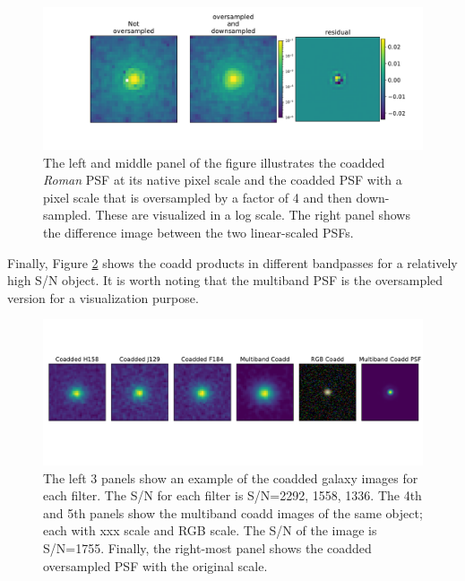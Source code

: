\documentclass[fleqn,usenatbib]{mnras}
\begin{document}
\begin{figure}
	\includegraphics[width=\columnwidth]{figure3.pdf}
    \vspace*{-5mm}
    \caption{The left and middle panel of the figure illustrates the coadded \emph{Roman} PSF at its native pixel scale and the coadded PSF with a pixel scale that is oversampled by a factor of 4 and then down-sampled. These are visualized in a log scale. The right panel shows the difference image between the two linear-scaled PSFs. }
    \label{fig:coadd_oversample_res}
\end{figure}

Finally, Figure \ref{fig:single_to_coadd_rgb} shows the coadd products in different bandpasses for a relatively high S/N object. It is worth noting that the multiband PSF is the oversampled version for a visualization purpose. 

\begin{figure}
	\includegraphics[width=\textwidth]{figure4_og.pdf}
    \vspace*{-20mm}
    \caption{The left 3 panels show an example of the coadded galaxy images for each filter. The S/N for each filter is S/N=2292, 1558, 1336. The 4th and 5th panels show the multiband coadd images of the same object; each with xxx scale and RGB scale. The S/N of the image is S/N=1755. Finally, the right-most panel shows the coadded oversampled PSF with the original scale.}
    \label{fig:single_to_coadd_rgb}
\end{figure}
\end{document}
